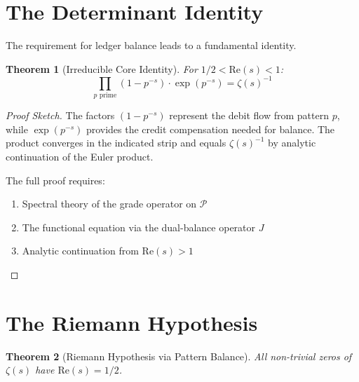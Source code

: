 \documentclass[12pt]{article}
\newtheorem{theorem}{Theorem}[section]
\theoremstyle{definition}
\theoremstyle{remark}
\begin{document}
\section{The Determinant Identity}

The requirement for ledger balance leads to a fundamental identity.

\begin{theorem}[Irreducible Core Identity]
For $1/2 < \text{Re}(s) < 1$:
$$\prod_{p \text{ prime}} (1 - p^{-s}) \cdot \exp(p^{-s}) = \zeta(s)^{-1}$$
\end{theorem}

\begin{proof}[Proof Sketch]
The factors $(1 - p^{-s})$ represent the debit flow from pattern $p$, while $\exp(p^{-s})$ provides the credit compensation needed for balance. The product converges in the indicated strip and equals $\zeta(s)^{-1}$ by analytic continuation of the Euler product.

The full proof requires:
\begin{enumerate}
\item Spectral theory of the grade operator on $\mathcal{P}$
\item The functional equation via the dual-balance operator $J$
\item Analytic continuation from $\text{Re}(s) > 1$
\end{enumerate}
\end{proof}

\section{The Riemann Hypothesis}

\begin{theorem}[Riemann Hypothesis via Pattern Balance]
All non-trivial zeros of $\zeta(s)$ have $\text{Re}(s) = 1/2$.
\end{theorem}
\end{document}
